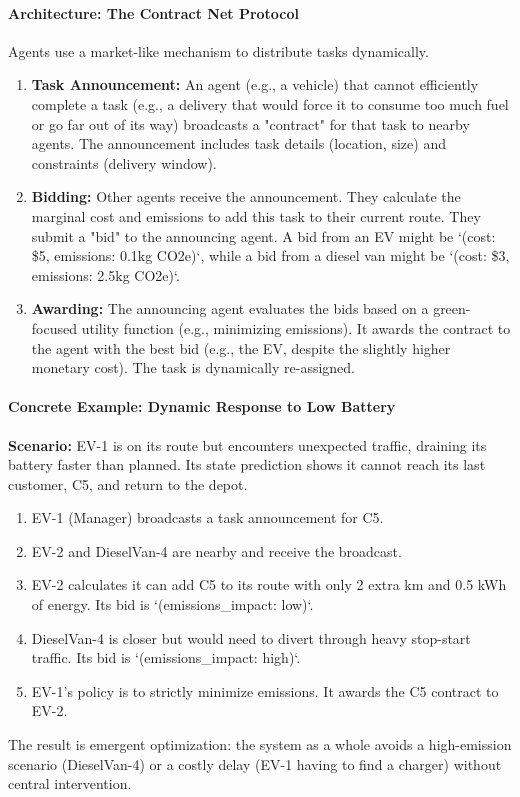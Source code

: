 \documentclass{article}
\begin{document}
\begin{enumerate}
\paragraph{Architecture: The Contract Net Protocol}
Agents use a market-like mechanism to distribute tasks dynamically.
\begin{enumerate}
    \item \textbf{Task Announcement:} An agent (e.g., a vehicle) that cannot efficiently complete a task (e.g., a delivery that would force it to consume too much fuel or go far out of its way) broadcasts a "contract" for that task to nearby agents. The announcement includes task details (location, size) and constraints (delivery window).
    \item \textbf{Bidding:} Other agents receive the announcement. They calculate the marginal cost and emissions to add this task to their current route. They submit a "bid" to the announcing agent. A bid from an EV might be `(cost: \$5, emissions: 0.1kg CO2e)`, while a bid from a diesel van might be `(cost: \$3, emissions: 2.5kg CO2e)`.
    \item \textbf{Awarding:} The announcing agent evaluates the bids based on a green-focused utility function (e.g., minimizing emissions). It awards the contract to the agent with the best bid (e.g., the EV, despite the slightly higher monetary cost). The task is dynamically re-assigned.
\end{enumerate}

\paragraph{Concrete Example: Dynamic Response to Low Battery}
\textbf{Scenario:} EV-1 is on its route but encounters unexpected traffic, draining its battery faster than planned. Its state prediction shows it cannot reach its last customer, C5, and return to the depot.
\begin{enumerate}
    \item EV-1 (Manager) broadcasts a task announcement for C5.
    \item EV-2 and DieselVan-4 are nearby and receive the broadcast.
    \item EV-2 calculates it can add C5 to its route with only 2 extra km and 0.5 kWh of energy. Its bid is `(emissions\_impact: low)`.
    \item DieselVan-4 is closer but would need to divert through heavy stop-start traffic. Its bid is `(emissions\_impact: high)`.
    \item EV-1's policy is to strictly minimize emissions. It awards the C5 contract to EV-2.
\end{enumerate}
The result is emergent optimization: the system as a whole avoids a high-emission scenario (DieselVan-4) or a costly delay (EV-1 having to find a charger) without central intervention.


\end{enumerate}
\end{document}

